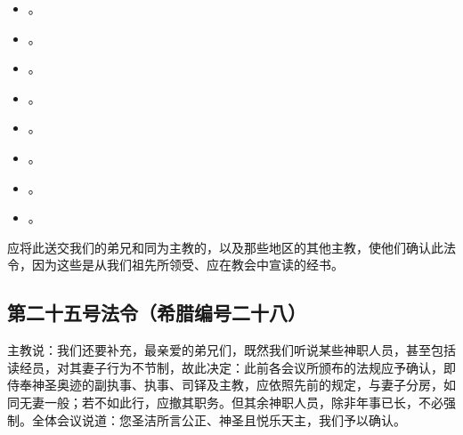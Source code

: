 \begin{itemize}
\item {}。
\end{itemize}

\begin{itemize}
\item {}。
\end{itemize}

\begin{itemize}
\item {}。
\end{itemize}

\begin{itemize}
\item {}。
\end{itemize}

\begin{itemize}
\item {}。
\end{itemize}

\begin{itemize}
\item {}。
\end{itemize}

\begin{itemize}
\item {}。
\end{itemize}

\begin{itemize}
\item {}。
\end{itemize}

应将此送交我们的弟兄和同为主教的，以及那些地区的其他主教，使他们确认此法令，因为这些是从我们祖先所领受、应在教会中宣读的经书。\par


\subsection{第二十五号法令（希腊编号二十八）}

\par

主教说：我们还要补充，最亲爱的弟兄们，既然我们听说某些神职人员，甚至包括读经员，对其妻子行为不节制，故此决定：此前各会议所颁布的法规应予确认，即侍奉神圣奥迹的副执事、执事、司铎及主教，应依照先前的规定，与妻子分房，如同无妻一般；若不如此行，应撤其职务。但其余神职人员，除非年事已长，不必强制。全体会议说道：您圣洁所言公正、神圣且悦乐天主，我们予以确认。\par

